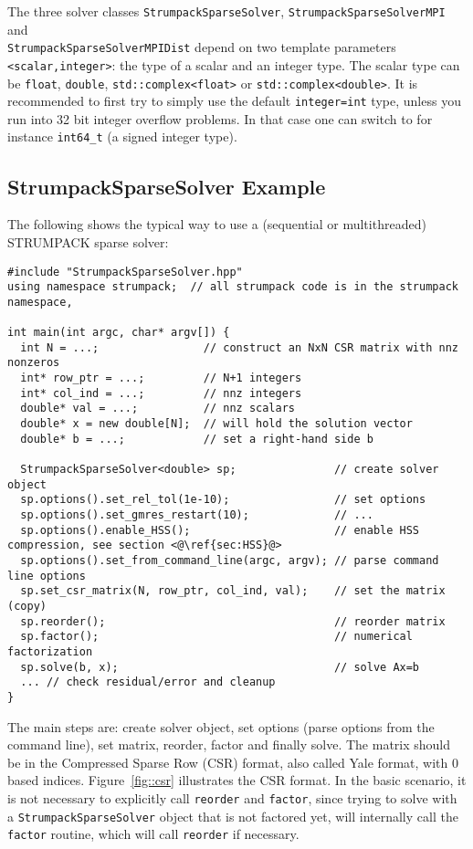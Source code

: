 \documentclass{article}
\begin{document}
The three solver classes \lstinline[style=C]!StrumpackSparseSolver!,
\lstinline[style=C]!StrumpackSparseSolverMPI! and\\
\lstinline[style=C]!StrumpackSparseSolverMPIDist! depend on two
template parameters \lstinline[style=C]!<scalar,integer>!: the type of
a scalar and an integer type. The scalar type can be
\lstinline[style=C]!float!, \lstinline[style=C]!double!,
\lstinline[style=C]!std::complex<float>! or
\lstinline[style=C]!std::complex<double>!. It is recommended to first
try to simply use the default \lstinline[style=C]!integer=int! type,
unless you run into 32 bit integer overflow problems. In that case one
can switch to for instance \lstinline[style=C]!int64_t! (a signed
integer type).

\subsection{StrumpackSparseSolver Example}
The following shows the typical way to use a (sequential or
multithreaded) STRUMPACK sparse solver:
\begin{lstlisting}[style=C]
#include "StrumpackSparseSolver.hpp"
using namespace strumpack;  // all strumpack code is in the strumpack namespace,

int main(int argc, char* argv[]) {
  int N = ...;                // construct an NxN CSR matrix with nnz nonzeros
  int* row_ptr = ...;         // N+1 integers
  int* col_ind = ...;         // nnz integers
  double* val = ...;          // nnz scalars
  double* x = new double[N];  // will hold the solution vector
  double* b = ...;            // set a right-hand side b

  StrumpackSparseSolver<double> sp;               // create solver object
  sp.options().set_rel_tol(1e-10);                // set options
  sp.options().set_gmres_restart(10);             // ...
  sp.options().enable_HSS();                      // enable HSS compression, see section <@\ref{sec:HSS}@>
  sp.options().set_from_command_line(argc, argv); // parse command line options
  sp.set_csr_matrix(N, row_ptr, col_ind, val);    // set the matrix (copy)
  sp.reorder();                                   // reorder matrix
  sp.factor();                                    // numerical factorization
  sp.solve(b, x);                                 // solve Ax=b
  ... // check residual/error and cleanup
}
\end{lstlisting}
The main steps are: create solver object, set options (parse options
from the command line), set matrix, reorder, factor and finally
solve. The matrix should be in the Compressed Sparse Row (CSR) format,
also called Yale format, with $0$ based indices. Figure~\ref{fig::csr}
illustrates the CSR format. In the basic scenario, it is not necessary
to explicitly call \lstinline[style=C]!reorder!  and
\lstinline[style=C]!factor!, since trying to solve with a
\lstinline[style=C]!StrumpackSparseSolver! object that is not factored
yet, will internally call the \lstinline[style=C]!factor! routine,
which will call \lstinline[style=C]!reorder! if necessary.
\end{document}

